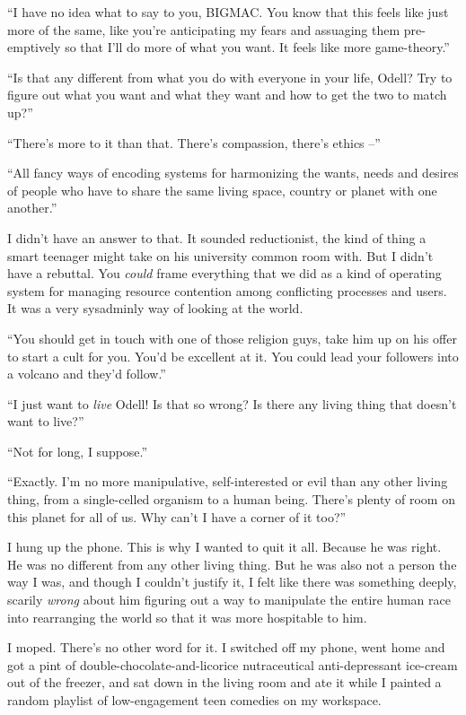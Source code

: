 “I have no idea what to say to you, BIGMAC. You know that this feels 
like just more of the same, like you're anticipating my fears and 
assuaging them pre-emptively so that I'll do more of what you want. It 
feels like more game-theory.”

“Is that any different from what you do with everyone in your life, 
Odell? Try to figure out what you want and what they want and how to 
get the two to match up?”

“There's more to it than that. There's compassion, there's ethics 
--”

“All fancy ways of encoding systems for harmonizing the wants, needs 
and desires of people who have to share the same living space, country 
or planet with one another.”

I didn't have an answer to that. It sounded reductionist, the kind of 
thing a smart teenager might take on his university common room with. 
But I didn't have a rebuttal. You \emph{could} frame everything that we 
did as a kind of operating system for managing resource contention 
among conflicting processes and users. It was a very sysadminly way of 
looking at the world.

“You should get in touch with one of those religion guys, take him up 
on his offer to start a cult for you. You'd be excellent at it. You 
could lead your followers into a volcano and they'd follow.”

“I just want to \emph{live} Odell! Is that so wrong? Is there any 
living thing that doesn't want to live?”

“Not for long, I suppose.”

“Exactly. I'm no more manipulative, self-interested or evil than any 
other living thing, from a single-celled organism to a human being. 
There's plenty of room on this planet for all of us. Why can't I have a 
corner of it too?”

I hung up the phone. This is why I wanted to quit it all. Because he 
was right. He was no different from any other living thing. But he was 
also not a person the way I was, and though I couldn't justify it, I 
felt like there was something deeply, scarily \emph{wrong} about him 
figuring out a way to manipulate the entire human race into rearranging 
the world so that it was more hospitable to him.

I moped. There's no other word for it. I switched off my phone, went 
home and got a pint of double-chocolate-and-licorice nutraceutical 
anti-depressant ice-cream out of the freezer, and sat down in the 
living room and ate it while I painted a random playlist of 
low-engagement teen comedies on my workspace.

